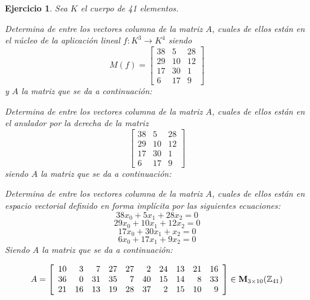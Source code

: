 \documentclass[12pt]{amsart}
\newtheorem{ejer}{Ejercicio}
\begin{document}
\begin{ejer} Sea $K$ el cuerpo de 41 elementos.
\newline
\noindent\begin{minipage}{\textwidth}
\begin{tcolorbox}[colback = green!20!white,title=Versión Núcleo]
Determina de entre los vectores columna de la matriz $A$, cuales de ellos están en el núcleo de la aplicación lineal $f:K^{3} \to K^{4}$ siendo  $$ M(f) = \left[\begin{array}{rrr}
38 & 5 & 28 \\
29 & 10 & 12 \\
17 & 30 & 1 \\
6 & 17 & 9
\end{array}\right] $$ y $A$ la matriz que se da a continuación:\end{tcolorbox}
\end{minipage} \newline
\noindent\begin{minipage}{\textwidth}
\begin{tcolorbox}[colback = blue!20!white,title=Versión Anulador]
Determina de entre los vectores columna de la matriz $A$, cuales de ellos están en el anulador por la derecha de la matriz $$ \left[\begin{array}{rrr}
38 & 5 & 28 \\
29 & 10 & 12 \\
17 & 30 & 1 \\
6 & 17 & 9
\end{array}\right] $$ siendo $A$ la matriz que se da a continuación:\end{tcolorbox}
\end{minipage} \newline
\noindent\begin{minipage}{\textwidth} 
\begin{tcolorbox}[colback = red!20!white,title=Versión Ecuaciones Implícitas]
Determina de entre los vectores columna de la matriz $A$, cuales de ellos están en espacio vectorial definido en forma implícita por las siguientes ecuaciones:
\[ 38 x_{0} + 5 x_{1} + 28 x_{2} = 0 \]
\[ 29 x_{0} + 10 x_{1} + 12 x_{2} = 0 \]
\[ 17 x_{0} + 30 x_{1} + x_{2} = 0 \]
\[ 6 x_{0} + 17 x_{1} + 9 x_{2} = 0 \]
Siendo $A$ la matriz que se da a continuación:
\end{tcolorbox}
\end{minipage}
\[ A = \left[\begin{array}{rrrrrrrrrr}
10 & 3 & 7 & 27 & 27 & 2 & 24 & 13 & 21 & 16 \\
36 & 0 & 31 & 35 & 7 & 40 & 15 & 14 & 8 & 33 \\
21 & 16 & 13 & 19 & 28 & 37 & 2 & 15 & 10 & 9
\end{array}\right] \in {\bf M}_{3\times 10}({\mathbb Z}_{41})\]
\end{ejer}
\end{document}
